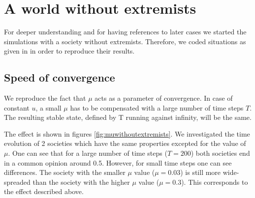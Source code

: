 \documentclass[11pt]{article}
\begin{document}
\section{A world without extremists}
For deeper understanding and for having references to later cases we started the simulations with a society without extremists. Therefore, we coded situations as given in \cite{Minor} in order to reproduce their results.

\subsection{Speed of convergence}
We reproduce the fact that $\mu$ acts as a parameter of convergence. In case of constant $u$, a small $\mu$ has to be compensated with a large number of time steps $T$. The resulting stable state, defined by T running against infinity, will be the same.

The effect is shown in figures \ref{fig:muwithoutextremists}. We investigated the time evolution of 2 societies which have the same properties excepted for the value of $\mu$. One can see that for a large number of time steps ($T=200$) both societies end in a common opinion around 0.5. However, for small time steps one can see differences. The society with the smaller $\mu$ value ($\mu = 0.03$) is still more wide-spreaded than the society with the higher $\mu$ value ($\mu = 0.3$). This corresponds to the effect described above.
\end{document}
